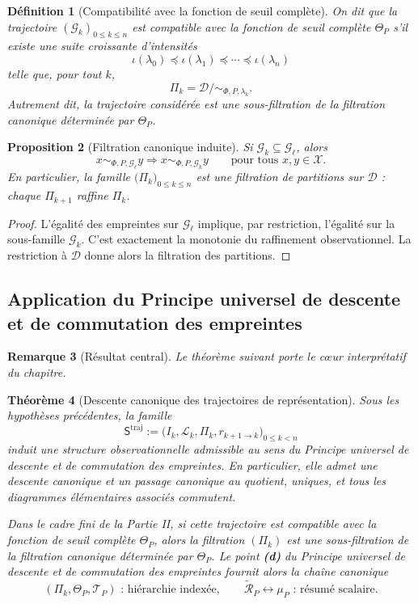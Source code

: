 \documentclass[11pt,a4paper,openany]{book}
\newtheorem{definition}{Définition}[chapter]
\newtheorem{proposition}[definition]{Proposition}
\newtheorem{theorem}[definition]{Théorème}
\newtheorem{remark}[definition]{Remarque}
\begin{document}
\begin{definition}[Compatibilité avec la fonction de seuil complète]
On dit que la trajectoire \((\mathcal G_k)_{0\le k\le n}\) est \emph{compatible avec} la fonction de seuil complète \(\Theta_P\) s'il existe une suite croissante d'intensités
\[
\iota(\lambda_0)\preceq \iota(\lambda_1)\preceq \cdots \preceq \iota(\lambda_n)
\]
telle que, pour tout \(k\),
\[
\Pi_k=\mathcal D/{\sim_{\Phi,P,\lambda_k}}.
\]
Autrement dit, la trajectoire considérée est une sous-filtration de la filtration canonique déterminée par \(\Theta_P\).
\end{definition}

\begin{proposition}[Filtration canonique induite]
Si \(\mathcal G_k\subseteq \mathcal G_\ell\), alors
\[
x\sim_{\Phi,P,\mathcal G_\ell}y \Longrightarrow x\sim_{\Phi,P,\mathcal G_k}y
\qquad \text{pour tous }x,y\in\mathcal X.
\]
En particulier, la famille \(\bigl(\Pi_k\bigr)_{0\le k\le n}\) est une filtration de partitions sur \(\mathcal D\) : chaque \(\Pi_{k+1}\) raffine \(\Pi_k\).
\end{proposition}

\begin{proof}
L'égalité des empreintes sur \(\mathcal G_\ell\) implique, par restriction, l'égalité sur la sous-famille \(\mathcal G_k\). C'est exactement la monotonie du raffinement observationnel. La restriction à \(\mathcal D\) donne alors la filtration des partitions.
\end{proof}

\subsection{Application du Principe universel de descente et de commutation des empreintes}

\begin{remark}[Résultat central]
Le théorème suivant porte le cœur interprétatif du chapitre.
\end{remark}

\begin{theorem}[Descente canonique des trajectoires de représentation]
\label{thm:descente-trajectoire}
Sous les hypothèses précédentes, la famille
\[
\mathsf S^{\mathrm{traj}}
:=
\bigl(I_k,\mathcal L_k,\Pi_k,r_{k+1\to k}\bigr)_{0\le k<n}
\]
induit une structure observationnelle admissible au sens du \emph{Principe universel de descente et de commutation des empreintes}. En particulier, elle admet une descente canonique et un passage canonique au quotient, uniques, et tous les diagrammes élémentaires associés commutent.

Dans le cadre fini de la Partie II, si cette trajectoire est compatible avec la fonction de seuil complète \(\Theta_P\), alors la filtration \((\Pi_k)\) est une sous-filtration de la filtration canonique déterminée par \(\Theta_P\). Le point \textbf{(d)} du \emph{Principe universel de descente et de commutation des empreintes} fournit alors la chaîne canonique
\[
(\Pi_k,\Theta_P,\mathcal T_P)\text{ : hiérarchie indexée},\qquad \widetilde{\mathcal R}_P\leftrightarrow\mu_P\text{ : résumé scalaire}.
\]
\end{theorem}
\end{document}
